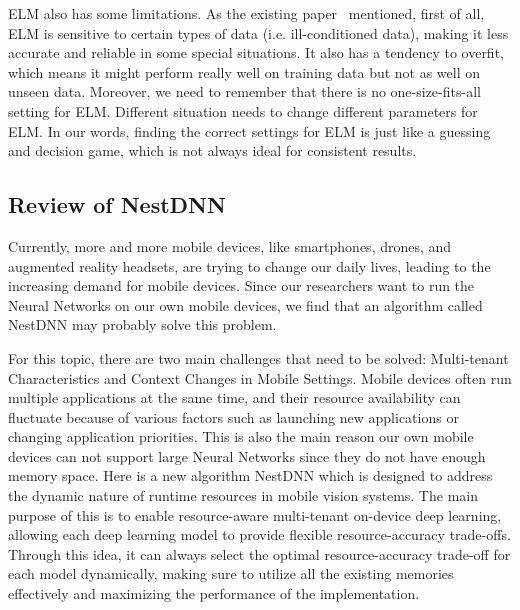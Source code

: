 \documentclass{article}
\begin{document}
ELM also has some limitations. As the existing paper~\cite{akusok2019metal} mentioned, first of all, ELM is sensitive to certain types of data (i.e. ill-conditioned data), making it less accurate and reliable in some special situations. It also has a tendency to overfit, which means it might perform really well on training data but not as well on unseen data. Moreover, we need to remember that there is no one-size-fits-all setting for ELM. Different situation needs to change different parameters for ELM. In our words, finding the correct settings for ELM is just like a guessing and decision game, which is not always ideal for consistent results.


\subsection{Review of NestDNN}
Currently, more and more mobile devices, like smartphones, drones, and augmented reality headsets, are trying to change our daily lives, leading to the increasing demand for mobile devices. Since our researchers want to run the Neural Networks on our own mobile devices, we find that an algorithm called NestDNN may probably solve this problem. 

For this topic, there are two main challenges that need to be solved: Multi-tenant Characteristics and Context Changes in Mobile Settings. Mobile devices often run multiple applications at the same time, and their resource availability can fluctuate because of various factors such as launching new applications or changing application priorities. This is also the main reason our own mobile devices can not support large Neural Networks since they do not have enough memory space. Here is a new algorithm NestDNN which is designed to address the dynamic nature of runtime resources in mobile vision systems. The main purpose of this is to enable resource-aware multi-tenant on-device deep learning, allowing each deep learning model to provide flexible resource-accuracy trade-offs. Through this idea, it can always select the optimal resource-accuracy trade-off for each model dynamically, making sure to utilize all the existing memories effectively and maximizing the performance of the implementation.
\end{document}
